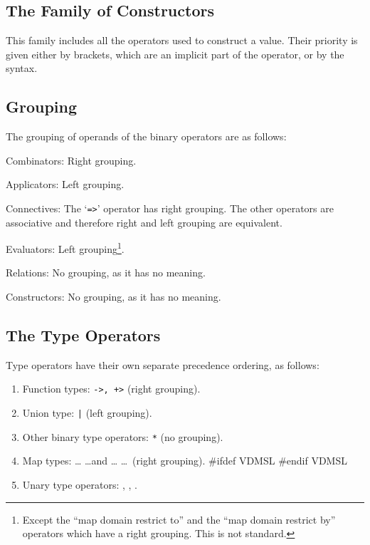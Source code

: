 \documentclass[\pformat,12pt]{article}
\newlength{\nonstandlen}
\newcommand{\nonstandard}[1]{%
#ifdef VDMSL
\setlength{\nonstandlen}{#1\baselineskip}%
  \marginpar{\hspace*{-3mm}\raisebox{\nonstandlen}[0pt][0pt]{\fbox{{\footnotesize Non standard}}}}%
#endif VDMSL
}
\begin{document}
\subsection{The Family of Constructors}

This family includes all the operators used to construct a value.  Their
priority is given either by brackets, which are an implicit part of the
operator, or by the syntax.

\subsection{Grouping}\label{grouping}

The grouping of operands of the binary operators are as follows:

\begin{list}{\bf no label!}{%
    \def\mylabel#1{\hspace\labelsep #1\hfill}
    \let\makelabel\mylabel
    \settowidth{\labelwidth}{Constructors: }
    \setlength{\leftmargin}{\labelwidth}
    \addtolength{\leftmargin}{2\labelsep}
    }
\item[Combinators:] Right grouping.

\item[Applicators:] Left grouping.

\item[Connectives:] The `{\tt =>}' operator has right grouping.  The other
  operators are associative and therefore right and left grouping are
  equivalent.
  
\item[Evaluators:] Left grouping\footnote{Except the ``map domain restrict
    to'' and the ``map domain restrict by'' operators which have a right
    grouping. This is not standard.}.

\item[Relations:] No grouping, as it has no meaning.

\item[Constructors:] No grouping, as it has no meaning.
\end{list}

\subsection{The Type Operators}\label{preceedence}

Type operators have their own separate precedence ordering, as follows:
\begin{enumerate}
\item Function types: {\tt ->, +>} (right grouping).

\item Union type: {\tt |} (left grouping).

\item Other binary type operators: \verb+*+ (no grouping).

\item Map types:  \ldots {} \ldots and  \ldots
   \ldots\ (right grouping).\nonstandard{0}

\item Unary type operators: , , .
\end{enumerate}
\end{document}
